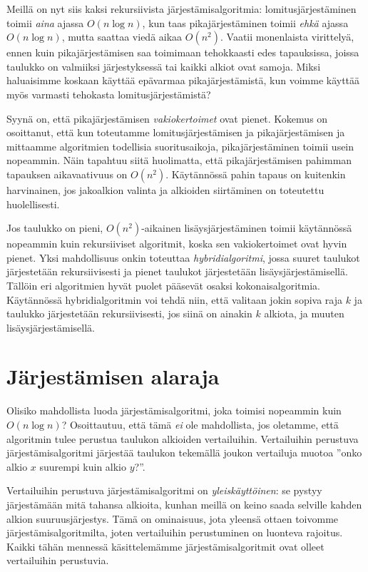 Meillä on nyt siis kaksi rekursiivista järjestämisalgoritmia:
lomitusjärjestä\-minen toimii \emph{aina} ajassa $O(n \log n)$,
kun taas pikajärjestäminen toimii \emph{ehkä} ajassa $O(n \log n)$,
mutta saattaa viedä aikaa $O(n^2)$.
Vaatii monenlaista virittelyä,
ennen kuin pikajärjestämisen saa toimimaan tehokkaasti
edes tapauksissa, joissa taulukko on valmiiksi järjestyksessä
tai kaikki alkiot ovat samoja.
Miksi haluaisimme koskaan käyttää epävarmaa pikajärjestämistä,
kun voimme käyttää myös varmasti tehokasta lomitusjärjestämistä?


Syynä on, että pikajärjestämisen \emph{vakiokertoimet} ovat pienet.
Kokemus on osoittanut, että kun toteutamme lomitusjärjestämisen ja
pikajärjestämisen ja mittaamme algoritmien todellisia suoritusaikoja,
pikajärjestäminen toimii usein nopeammin.
Näin tapahtuu siitä huolimatta, että pikajärjestämisen pahimman
tapauksen aikavaativuus on $O(n^2)$.
Käytännössä pahin tapaus on kuitenkin harvinainen,
jos jakoalkion valinta ja alkioiden siirtäminen on toteutettu huolellisesti.


Jos taulukko on pieni, $O(n^2)$-aikainen lisäysjärjestäminen
toimii käytän\-nössä nopeammin kuin rekursiiviset algoritmit,
koska sen vakiokertoimet ovat hyvin pienet.
Yksi mahdollisuus onkin toteuttaa \emph{hybridialgoritmi},
jossa suuret taulukot järjes\-tetään rekursiivisesti
ja pienet taulukot järjes\-tetään lisäysjärjestämisellä.
Tällöin eri algoritmien hyvät puolet pääsevät osaksi
kokonaisalgoritmia.
Käytännössä hybridialgoritmin voi tehdä niin,
että valitaan jokin sopiva raja $k$ ja
taulukko järjestetään rekursiivisesti,
jos siinä on ainakin $k$ alkiota, ja muuten lisäysjärjestämisellä.

\section{Järjestämisen alaraja}

Olisiko mahdollista luoda järjestämisalgoritmi, joka toimisi
nopeammin kuin $O(n \log n)$?
Osoittautuu, että tämä \emph{ei} ole mahdollista,
jos oletamme, että algoritmin tulee perustua taulukon
alkioiden vertailuihin.
Vertailuihin perustuva järjestämisalgoritmi järjestää taulukon
tekemällä joukon vertailuja muotoa
''onko alkio $x$ suurempi kuin alkio $y$?''.

Vertailuihin perustuva järjestämisalgoritmi on \emph{yleiskäyttöinen}:
se pystyy järjestämään mitä tahansa alkioita,
kunhan meillä on keino saada selville kahden alkion suuruusjärjestys.
Tämä on ominaisuus, jota yleensä ottaen toivomme
järjestämisalgoritmilta, joten vertailuihin perustuminen
on luonteva rajoitus.
Kaikki tähän mennessä käsittelemämme järjestämisalgoritmit
ovat olleet vertailuihin perustuvia.

